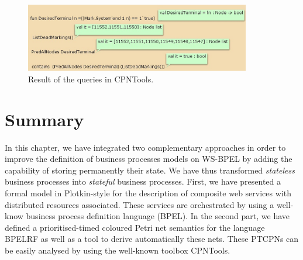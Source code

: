 \begin{figure}[h]
\begin{center}%
\includegraphics[width=\textwidth,height=3cm]{Figures/queries.eps}
\vspace{-0.7cm}
\caption{Result of the queries in CPNTools.}\label{queries}
\end{center}
\end{figure}
\vspace{-0.7cm}
%
%




\section{Summary}\label{sumBPELRF}
In this chapter, we have integrated two complementary approaches in order to improve the definition of business processes models on WS-BPEL by adding
the capability of storing permanently their state. We have thus transformed {\em stateless} business processes into {\em stateful} business processes. 
First, we have presented a formal model in Plotkin-style for the description of composite web services with distributed resources associated. These services are orchestrated by using a well-know business process definition language (BPEL). In the second part, we have defined a prioritised-timed coloured Petri net semantics for the language BPELRF as well as a tool to derive automatically these nets. These PTCPNs can be easily analysed by using the well-known toolbox CPNTools. 

